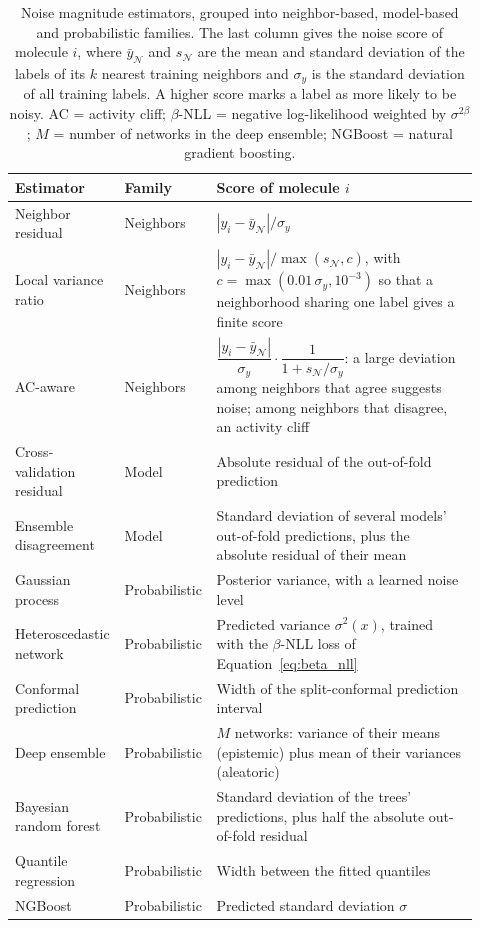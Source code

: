 \begin{table}[htbp]
\centering
\small
\begin{adjustbox}{max width=\textwidth}
\begin{tabular}{@{}P{0.2\linewidth}P{0.15\linewidth}P{0.57\linewidth}@{}}
\toprule
Estimator & Family & Score of molecule $i$ \\
\midrule
Neighbor residual & Neighbors & $|y_i - \bar y_{\mathcal{N}}| / \sigma_y$ \\
Local variance ratio & Neighbors & $|y_i - \bar y_{\mathcal{N}}| / \max(s_{\mathcal{N}}, c)$, with $c = \max(0.01\,\sigma_y, 10^{-3})$ so that a neighborhood sharing one label gives a finite score \\
AC-aware & Neighbors & $\dfrac{|y_i - \bar y_{\mathcal{N}}|}{\sigma_y} \cdot \dfrac{1}{1 + s_{\mathcal{N}}/\sigma_y}$: a large deviation among neighbors that agree suggests noise; among neighbors that disagree, an activity cliff \citep{Dablander2023} \\
Cross-validation residual & Model & Absolute residual of the out-of-fold prediction \\
Ensemble disagreement & Model & Standard deviation of several models' out-of-fold predictions, plus the absolute residual of their mean \\
Gaussian process & Probabilistic & Posterior variance, with a learned noise level \citep{gauche} \\
Heteroscedastic network & Probabilistic & Predicted variance $\sigma^2(x)$, trained with the $\beta$-NLL loss of Equation~\ref{eq:beta_nll} \citep{Seitzer2022} \\
Conformal prediction & Probabilistic & Width of the split-conformal prediction interval \citep{Shafer2008} \\
Deep ensemble & Probabilistic & $M$ networks: variance of their means (epistemic) plus mean of their variances (aleatoric) \citep{lakshminarayanan2017} \\
Bayesian random forest & Probabilistic & Standard deviation of the trees' predictions, plus half the absolute out-of-fold residual \citep{taddy2015} \\
Quantile regression & Probabilistic & Width between the fitted quantiles \\
NGBoost & Probabilistic & Predicted standard deviation $\sigma$ \citep{Duan2020} \\
\bottomrule
\end{tabular}
\end{adjustbox}
\caption[Noise magnitude estimators.]{Noise magnitude estimators, grouped into neighbor-based, model-based and probabilistic families. The last column gives the noise score of molecule $i$, where $\bar y_{\mathcal{N}}$ and $s_{\mathcal{N}}$ are the mean and standard deviation of the labels of its $k$ nearest training neighbors and $\sigma_y$ is the standard deviation of all training labels. A higher score marks a label as more likely to be noisy. AC = activity cliff; $\beta$-NLL = negative log-likelihood weighted by $\sigma^{2\beta}$; $M$ = number of networks in the deep ensemble; NGBoost = natural gradient boosting.}
\label{tab:noise_estimators}
\end{table}

